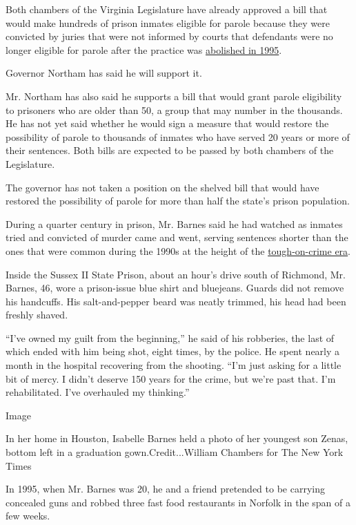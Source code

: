 Both chambers of the Virginia Legislature have already approved a bill
that would make hundreds of prison inmates eligible for parole because
they were convicted by juries that were not informed by courts that
defendants were no longer eligible for parole after the practice was
\href{http://www.ncrp.info/StateFactSheets.aspx?state=VA}{abolished in
1995}.

Governor Northam has said he will support it.

Mr. Northam has also said he supports a bill that would grant parole
eligibility to prisoners who are older than 50, a group that may number
in the thousands. He has not yet said whether he would sign a measure
that would restore the possibility of parole to thousands of inmates who
have served 20 years or more of their sentences. Both bills are expected
to be passed by both chambers of the Legislature.

The governor has not taken a position on the shelved bill that would
have restored the possibility of parole for more than half the state's
prison population.

During a quarter century in prison, Mr. Barnes said he had watched as
inmates tried and convicted of murder came and went, serving sentences
shorter than the ones that were common during the 1990s at the height of
the
\href{https://www.nytimes3xbfgragh.onion/2019/08/20/us/politics/criminal-justice-reform-sanders-warren.html}{tough-on-crime
era}.

Inside the Sussex II State Prison, about an hour's drive south of
Richmond, Mr. Barnes, 46, wore a prison-issue blue shirt and bluejeans.
Guards did not remove his handcuffs. His salt-and-pepper beard was
neatly trimmed, his head had been freshly shaved.

``I've owned my guilt from the beginning,'' he said of his robberies,
the last of which ended with him being shot, eight times, by the police.
He spent nearly a month in the hospital recovering from the shooting.
``I'm just asking for a little bit of mercy. I didn't deserve 150 years
for the crime, but we're past that. I'm rehabilitated. I've overhauled
my thinking.''

Image

In her home in Houston, Isabelle Barnes held a photo of her youngest son
Zenas, bottom left in a graduation gown.Credit...William Chambers for
The New York Times

In 1995, when Mr. Barnes was 20, he and a friend pretended to be
carrying concealed guns and robbed three fast food restaurants in
Norfolk in the span of a few weeks.

